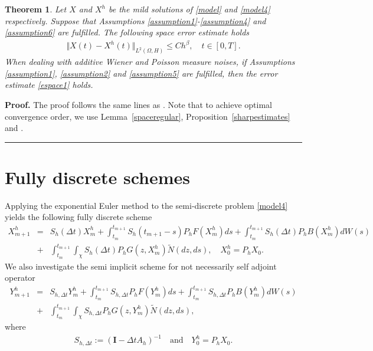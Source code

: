 \documentclass[review,12pt]{elsarticle}
\newtheorem{theorem}{Theorem}[section]
\newenvironment{proof}[1][Proof]{\textbf{#1.} }{\hspace{\stretch{1}}\rule{0.5em}{0.5em}}
\newcommand{\lemref}[1]{{Lemma~\ref{#1}}}
\newcommand{\propref}[1]{{Proposition~\ref{#1}}}
\begin{document}
\begin{theorem}
\label{spaceapproximation}
Let $X$ and $X^h$ be the mild solutions of \eqref{model} and \eqref{model4} respectively. Suppose that Assumptions \ref{assumption1}-\ref{assumption4} and \ref{assumption6} are fulfilled. The following space error estimate holds
\begin{eqnarray}
\label{espace1}
\Vert X(t)-X^h(t)\Vert_{L^2(\Omega, H)}\leq Ch^{\beta},\quad t\in[0, T].
\end{eqnarray}
When dealing with additive Wiener and Poisson measure noises, if Assumptions \ref{assumption1}, \ref{assumption2} and \ref{assumption5} are fulfilled, then the error estimate \eqref{espace1} holds.
\end{theorem}
\begin{proof} The proof follows the same lines as \cite[Theorem 5.1]{Yang}. Note that to achieve optimal convergence order, we use \lemref{spaceregular}, \propref{sharpestimates} and \cite[Lemma 3.2]{Antjd2}.
\end{proof}
\section{Fully discrete schemes}
\label{fulldiscretization1}
Applying the exponential Euler method \cite{Antonio1} to the semi-discrete problem \eqref{model4} yields the following fully discrete scheme
\begin{eqnarray}
\label{schema1}
X^h_{m+1}&=&S_h(\Delta t)X^h_m+\int_{t_m}^{t_{m+1}}S_h(t_{m+1}-s)P_hF(X^h_m)ds+\int_{t_m}^{t_{m+1}}S_h(\Delta t)P_hB(X^h_m)dW(s)\nonumber\\
&+& \int_{t_m}^{t_{m+1}}\int_{\chi}S_h(\Delta t)P_h G(z, X^h_m)\widetilde{N}(dz, ds),\quad X^h_0=P_hX_0.
\end{eqnarray}
    We also investigate the semi implicit scheme \cite{Yang} for not necessarily self adjoint operator 
    \begin{eqnarray}
    \label{vend1}
Y^h_{m+1}&=&S_{h, \Delta t}Y^h_m+\int_{t_m}^{t_{m+1}}S_{h, \Delta t}P_hF(Y^h_m)ds+\int_{t_m}^{t_{m+1}}S_{h, \Delta t}P_hB(Y^h_m)dW(s)\nonumber\\
&+&\int_{t_m}^{t_{m+1}}\int_{\chi}S_{h, \Delta t}P_hG(z, Y^h_m)\widetilde{N}(dz, ds),
\end{eqnarray}
where 
\begin{eqnarray}
\label{vend1a}
S_{h, \Delta t}:=(\mathbf{I}-\Delta tA_h)^{-1}\quad \text{and}\quad  Y^h_0=P_hX_0.
\end{eqnarray}
\end{document}
